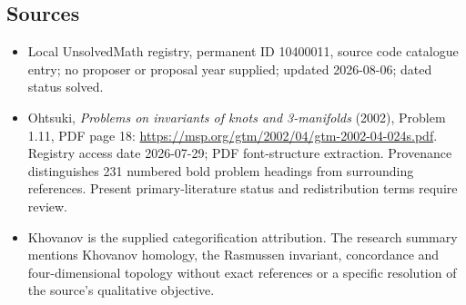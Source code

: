 \documentclass[11pt]{article}
\begin{document}
\subsection{Sources}
\begin{itemize}
\item Local UnsolvedMath registry, permanent ID 10400011, source code catalogue entry; no proposer or proposal year supplied; updated 2026-08-06; dated status solved.
\item Ohtsuki, \emph{Problems on invariants of knots and 3-manifolds} (2002), Problem 1.11, PDF page 18: \url{https://msp.org/gtm/2002/04/gtm-2002-04-024s.pdf}. Registry access date 2026-07-29; PDF font-structure extraction. Provenance distinguishes 231 numbered bold problem headings from surrounding references. Present primary-literature status and redistribution terms require review.
\item Khovanov is the supplied categorification attribution. The research summary mentions Khovanov homology, the Rasmussen invariant, concordance and four-dimensional topology without exact references or a specific resolution of the source's qualitative objective.
\end{itemize}
\end{document}

